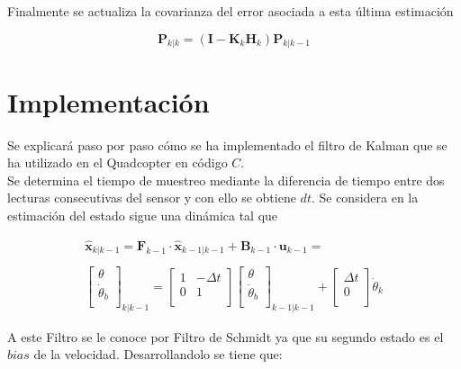 \documentclass[twoside,11pt]{book}
\begin{document}
Finalmente se actualiza la covarianza del error asociada a esta última estimación


\begin{equation}
\mathbf{P}_{k|k} = (\mathbf{I} - \mathbf{K}_{k}\mathbf{H}_{k})\mathbf{P}_{k|k-1}
\end{equation}


\section*{Implementación}

Se explicará paso por paso cómo se ha implementado el filtro de Kalman que se ha utilizado en el Quadcopter en código $C$.  \\

Se determina el tiempo de muestreo mediante la diferencia de tiempo entre dos lecturas consecutivas del sensor y con ello se obtiene $dt$. Se considera en la estimación del estado sigue una dinámica tal que 

\begin{equation}
\begin{array}{c}
\hat{\mathbf{x}}_{k|k-1}=\mathbf{F}_{k-1} \cdot \hat{\mathbf{x}}_{k-1|k-1} + \mathbf{B}_{k-1}\cdot \mathbf{u}_{k-1}= \\
\\ \left[ \begin{array}{c}
\theta \\
\dot{\theta}_{b} \\ \end{array} \right]_{k|k-1} = \left[ \begin{array}{cc}
1 & -\Delta t \\
0 & 1  \\ \end{array} \right]  \left[ \begin{array}{c}
\theta \\
\dot{\theta}_{b} \\ \end{array} \right]_{k-1|k-1} + \left[ \begin{array}{c}
\Delta t \\
0 \\ \end{array} \right]  \dot{\theta}_{k}
\end{array}
\end{equation}

A este Filtro se le conoce por Filtro de Schmidt ya que su segundo estado es el $bias$ de la velocidad. Desarrollandolo se tiene que:
\end{document}
